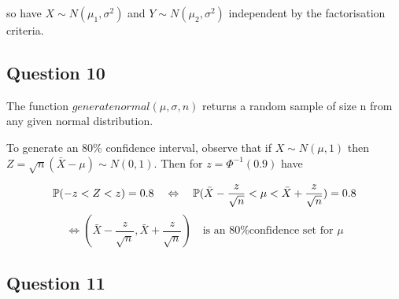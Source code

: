 \documentclass[10pt,a4paper]{report}
\begin{document}
so have $X \sim N(\mu_1,\sigma^2)$ and $Y \sim N(\mu_2,\sigma^2)$ independent by the factorisation criteria.

\subsection*{Question 10}
The function $generatenormal(\mu,\sigma,n)$ returns a random sample of size n from any given normal distribution. 

To generate an 80\% confidence interval, observe that if $X \sim N(\mu,1)$ then $Z=\sqrt{n}(\bar{X}-\mu) \sim N(0,1)$. Then for $z=\Phi^{-1}(0.9)$ have

\begin{equation*}
\mathbb{P}(-z<Z<z)=0.8
\quad\Leftrightarrow\quad \mathbb{P}(\bar{X}-\frac{z}{\sqrt{n}}<\mu<\bar{X}+\frac{z}{\sqrt{n}})=0.8\\
\end{equation*}
\begin{equation*}
\Leftrightarrow (\bar{X}-\frac{z}{\sqrt{n}},\bar{X}+\frac{z}{\sqrt{n}}) \quad \text{is an 80\% confidence set for $\mu$}
\end{equation*}

\subsection*{Question 11}
\end{document}
